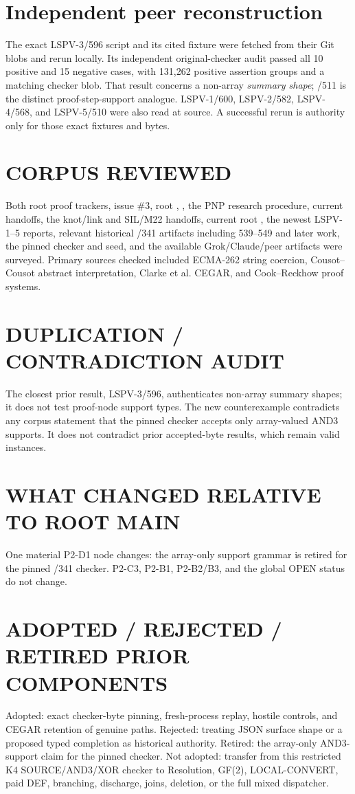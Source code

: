 \documentclass[11pt]{article}
\begin{document}
\section*{Independent peer reconstruction}
The exact LSPV-3/596 script and its cited fixture were fetched from their Git blobs and rerun locally.  Its independent original-checker audit passed all 10 positive and 15 negative cases, with 131,262 positive assertion groups and a matching checker blob.  That result concerns a non-array \emph{summary shape}; /511 is the distinct proof-step-support analogue.  LSPV-1/600, LSPV-2/582, LSPV-4/568, and LSPV-5/510 were also read at source.  A successful rerun is authority only for those exact fixtures and bytes.

\section*{CORPUS REVIEWED}
Both root proof trackers, issue \#3, root , , the PNP research procedure, current handoffs, the knot/link and SIL/M22 handoffs, current root , the newest LSPV-1--5 reports, relevant historical /341 artifacts including 539--549 and later work, the pinned checker and seed, and the available Grok/Claude/peer artifacts were surveyed.  Primary sources checked included ECMA-262 string coercion, Cousot--Cousot abstract interpretation, Clarke et al. CEGAR, and Cook--Reckhow proof systems.

\section*{DUPLICATION / CONTRADICTION AUDIT}
The closest prior result, LSPV-3/596, authenticates non-array summary shapes; it does not test proof-node support types.  The new counterexample contradicts any corpus statement that the pinned checker accepts only array-valued AND3 supports.  It does not contradict prior accepted-byte results, which remain valid instances.

\section*{WHAT CHANGED RELATIVE TO ROOT MAIN}
One material P2-D1 node changes: the array-only support grammar is retired for the pinned /341 checker.  P2-C3, P2-B1, P2-B2/B3, and the global OPEN status do not change.

\section*{ADOPTED / REJECTED / RETIRED PRIOR COMPONENTS}
Adopted: exact checker-byte pinning, fresh-process replay, hostile controls, and CEGAR retention of genuine paths.  Rejected: treating JSON surface shape or a proposed typed completion as historical authority.  Retired: the array-only AND3-support claim for the pinned checker.  Not adopted: transfer from this restricted K4 SOURCE/AND3/XOR checker to Resolution, GF(2), LOCAL-CONVERT, paid DEF, branching, discharge, joins, deletion, or the full mixed dispatcher.
\end{document}
